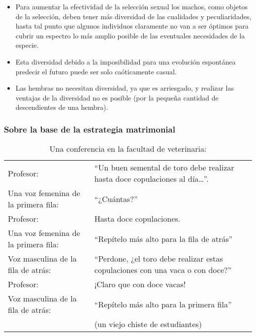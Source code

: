 \begin{itemize}
\tightlist
\item
  Para aumentar la efectividad de la selección sexual los machos, como
  objetos de la selección, deben tener más diversidad de las cualidades
  y peculiaridades, hasta tal punto que algunos individuos claramente no
  van a ser óptimos para cubrir un espectro lo más amplio posible de las
  eventuales necesidades de la especie.
\item
  Esta diversidad debido a la imposibilidad para una evolución
  espontánea predecir el futuro puede ser solo caóticamente casual.
\item
  Las hembras no necesitan diversidad, ya que es arriesgado, y realizar
  las ventajas de la diversidad no es posible (por la pequeña cantidad
  de descendientes de una hembra).
\end{itemize}

\protect\hypertarget{M6}{}{}

\hypertarget{sobre-la-base-de-la-estrategia-matrimonial}{\subsubsection{Sobre
la base de la estrategia
matrimonial}\label{sobre-la-base-de-la-estrategia-matrimonial}}

\begin{longtable}[]{@{}ll@{}}
\caption{Una conferencia en la facultad de veterinaria:}\tabularnewline
\toprule
Profesor: & ``Un buen semental de toro debe realizar hasta doce
copulaciones al día\ldots{}''.\tabularnewline
Una voz femenina de la primera fila: & ``¿Cuántas?''\tabularnewline
Profesor: & Hasta doce copulaciones.\tabularnewline
Una voz femenina de la primera fila: & ``Repítelo más alto para la fila
de atrás''\tabularnewline
Voz masculina de la fila de atrás: & ``Perdone, ¿el toro debe realizar
estas copulaciones con una vaca o con doce?''\tabularnewline
Profesor: & ¡Claro que con doce vacas!\tabularnewline
Voz masculina de la fila de atrás: & ``Repítelo más alto para la primera
fila''\tabularnewline
& (un viejo chiste de estudiantes)\tabularnewline
\bottomrule
\end{longtable}

